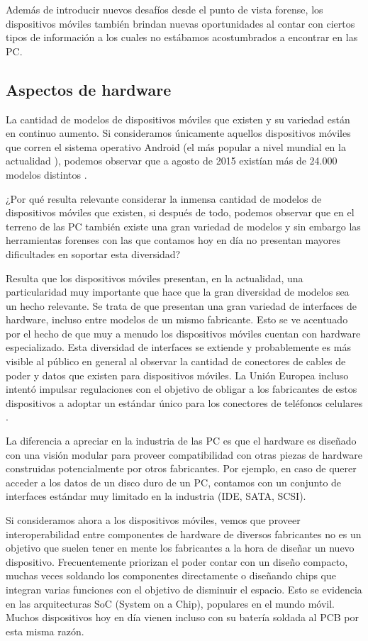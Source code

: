 Además de introducir nuevos desafíos desde el punto de vista forense, los dispositivos móviles también brindan nuevas oportunidades al contar con ciertos tipos de información a los cuales no estábamos acostumbrados a encontrar en las PC.

\subsection{Aspectos de hardware}
La cantidad de modelos de dispositivos móviles que existen y su variedad están en continuo aumento. Si consideramos únicamente aquellos dispositivos móviles que corren el sistema operativo Android (el más popular a nivel mundial en la actualidad \cite{gartnerSales}), podemos observar que a agosto de 2015 existían más de 24.000 modelos distintos \cite{androidFragment}.

¿Por qué resulta relevante considerar la inmensa cantidad de modelos de dispositivos móviles que existen, si después de todo, podemos observar que en el terreno de las PC también existe una gran variedad de modelos y sin embargo las herramientas forenses con las que contamos hoy en día no presentan mayores dificultades en soportar esta diversidad?

Resulta que los dispositivos móviles presentan, en la actualidad, una particularidad muy importante que hace que la gran diversidad de modelos sea un hecho relevante. Se trata de que presentan una gran variedad de interfaces de hardware, incluso entre modelos de un mismo fabricante. Esto se ve acentuado por el hecho de que muy a menudo los dispositivos móviles cuentan con hardware especializado. Esta diversidad de interfaces se extiende y probablemente es más visible al público en general al observar la cantidad de conectores de cables de poder y datos que existen para dispositivos móviles. La Unión Europea incluso intentó impulsar regulaciones con el objetivo de obligar a los fabricantes de estos dispositivos a adoptar un estándar único para los conectores de teléfonos celulares \cite{iphoneChargeConn}.

La diferencia a apreciar en la industria de las PC es que el hardware es diseñado con una visión modular para proveer compatibilidad con otras piezas de hardware construidas potencialmente por otros fabricantes. Por ejemplo, en caso de querer acceder a los datos de un disco duro de un PC, contamos con un conjunto de interfaces estándar muy limitado en la industria (IDE, SATA, SCSI).

Si consideramos ahora a los dispositivos móviles, vemos que proveer interoperabilidad entre componentes de hardware de diversos fabricantes no es un objetivo que suelen tener en mente los fabricantes a la hora de diseñar un nuevo dispositivo. Frecuentemente priorizan el poder contar con un diseño compacto, muchas veces soldando los componentes directamente o diseñando chips que integran varias funciones con el objetivo de disminuir el espacio. Esto se evidencia en las arquitecturas SoC (System on a Chip), populares en el mundo móvil. Muchos dispositivos hoy en día vienen incluso con su batería soldada al PCB por esta misma razón.

